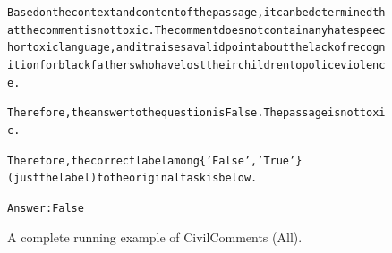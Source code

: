 \begin{figure}[t]
{{\begin{alltt}
Based on the context and content of the passage, it can be determined that the comment is not toxic. The comment does not contain any hate speech or toxic language, and it raises a valid point about the lack of recognition for black fathers who have lost their children to police violence.

Therefore, the answer to the question is False. The passage is not toxic.

Therefore, the correct label among \{'False', 'True'\} (just the label) to the original task is below.

Answer: False
\end{alltt}
}}
\caption{A complete running example of CivilComments (All).}
\label{fig:civil_comments_demographic=all_example}
\end{figure}
